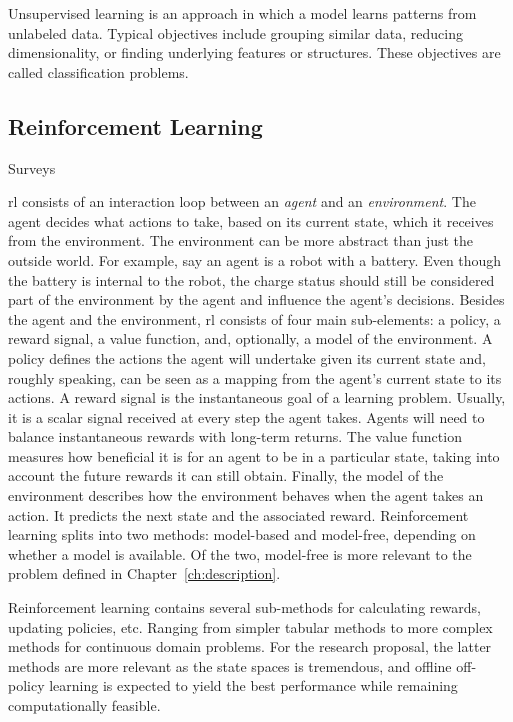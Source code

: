 Unsupervised learning is an approach in which a model learns patterns from unlabeled data.
Typical objectives include grouping similar data, reducing dimensionality, or finding underlying features or structures.
These objectives are called classification problems.

\subsection{Reinforcement Learning} \label{subsec:reinforcement}

Surveys~\cite{SHAKYA2023,wang2024}


\gls{rl} consists of an interaction loop between an \emph{agent} and an \emph{environment}.
The agent decides what actions to take, based on its current state, which it receives from the environment.
The environment can be more abstract than just the outside world.
For example, say an agent is a robot with a battery.
Even though the battery is internal to the robot, the charge status should still be considered part of the environment by the agent and influence the agent's decisions.
Besides the agent and the environment, \gls{rl} consists of four main sub-elements: a policy, a reward signal, a value function, and, optionally, a model of the environment.
A policy defines the actions the agent will undertake given its current state and, roughly speaking, can be seen as a mapping from the agent's current state to its actions.
A reward signal is the instantaneous goal of a learning problem.
Usually, it is a scalar signal received at every step the agent takes.
Agents will need to balance instantaneous rewards with long-term returns.
The value function measures how beneficial it is for an agent to be in a particular state, taking into account the future rewards it can still obtain.
Finally, the model of the environment describes how the environment behaves when the agent takes an action.
It predicts the next state and the associated reward.
Reinforcement learning splits into two methods: model-based and model-free, depending on whether a model is available.
Of the two, model-free is more relevant to the problem defined in Chapter~\ref{ch:description}.

Reinforcement learning contains several sub-methods for calculating rewards, updating policies, etc.
Ranging from simpler tabular methods to more complex methods for continuous domain problems.
For the research proposal, the latter methods are more relevant as the state spaces is tremendous, and offline off-policy learning is expected to yield the best performance while remaining computationally feasible.

